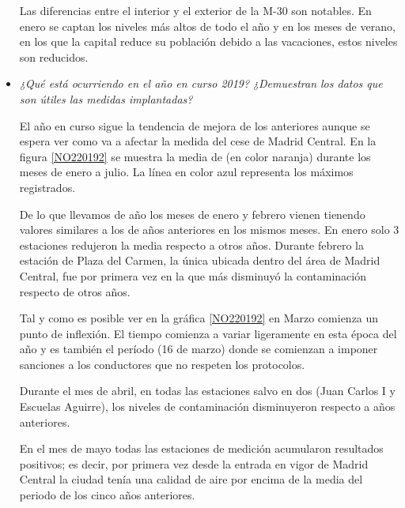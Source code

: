 \begin{itemize}
	Las diferencias entre el interior y el exterior de la M-30 son notables. En enero se captan los niveles más altos de todo el año y en los meses de verano, en los que la capital reduce su población debido a las vacaciones, estos niveles son reducidos. 
	
	
	\item \textit{¿Qué está ocurriendo en el año en curso 2019?} \textit{¿Demuestran los datos que son útiles las medidas implantadas?}
	
	El año en curso sigue la tendencia de mejora de los anteriores aunque se espera ver como va a afectar la medida del cese de Madrid Central. En la figura \ref{NO220192} se muestra la media de  (en color naranja) durante los meses de enero a julio. La línea en color azul representa los máximos registrados.
	
	De lo que llevamos de año los meses de enero y febrero vienen tienendo valores similares a los de años anteriores en los mismos meses. En enero solo 3 estaciones redujeron la media respecto a otros años. Durante febrero la estación de Plaza del Carmen, la única ubicada dentro del área de Madrid Central, fue por primera vez en la que más disminuyó la contaminación respecto de otros años.
	
	
	Tal y como es posible ver en la gráfica \ref{NO220192} en Marzo comienza un punto de inflexión. El tiempo comienza a variar ligeramente en esta época del año y es también el período (16 de marzo) donde se comienzan a imponer sanciones a los conductores que no respeten los protocolos. 
	
	Durante el mes de abril, en todas las estaciones salvo en dos (Juan Carlos I y Escuelas Aguirre), los niveles de contaminación disminuyeron respecto a años anteriores.
	
	En el mes de mayo todas las estaciones de medición acumularon resultados positivos; es decir, por primera vez desde la entrada en vigor de Madrid Central la ciudad tenía una calidad de aire por encima de la media del periodo de los cinco años anteriores.
\end{itemize}



	